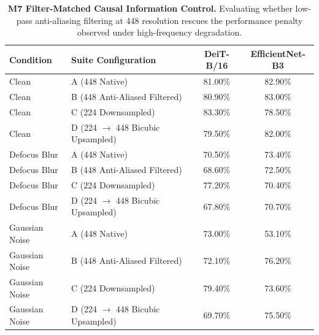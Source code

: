 \begin{table}[t]
\centering
\small
\caption{\textbf{M7 Filter-Matched Causal Information Control.}
Evaluating whether low-pass anti-aliasing filtering at 448 resolution rescues the performance penalty observed under high-frequency degradation.}
\label{tab:m7_control}
\begin{tabular}{llcc}
\toprule
\textbf{Condition} & \textbf{Suite Configuration} & \textbf{DeiT-B/16} & \textbf{EfficientNet-B3} \\
\midrule
Clean & A (448 Native) & 81.00\% & 82.90\% \\
Clean & B (448 Anti-Aliased Filtered) & 80.90\% & 83.00\% \\
Clean & C (224 Downsampled) & 83.30\% & 78.50\% \\
Clean & D (224 $\to$ 448 Bicubic Upsampled) & 79.50\% & 82.00\% \\
Defocus Blur & A (448 Native) & 70.50\% & 73.40\% \\
Defocus Blur & B (448 Anti-Aliased Filtered) & 68.60\% & 72.50\% \\
Defocus Blur & C (224 Downsampled) & 77.20\% & 70.40\% \\
Defocus Blur & D (224 $\to$ 448 Bicubic Upsampled) & 67.80\% & 70.70\% \\
Gaussian Noise & A (448 Native) & 73.00\% & 53.10\% \\
Gaussian Noise & B (448 Anti-Aliased Filtered) & 72.10\% & 76.20\% \\
Gaussian Noise & C (224 Downsampled) & 79.40\% & 73.60\% \\
Gaussian Noise & D (224 $\to$ 448 Bicubic Upsampled) & 69.70\% & 75.50\% \\
\bottomrule
\end{tabular}
\end{table}
